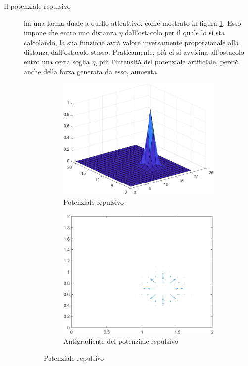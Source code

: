 \documentclass[14pt,a4paper]{extarticle}
\begin{document}
\begin{description}
\item[Il potenziale repulsivo] ha una forma duale a quello attrattivo, come mostrato in figura \ref{potR}. Esso impone che entro uno distanza \(\eta\) dall'ostacolo per il quale lo si sta calcolando, la sua funzione avrà valore inversamente proporzionale alla distanza dall'ostacolo stesso. Praticamente, più ci si avvicina all'ostacolo entro una certa soglia \(\eta\), più l'intensità del potenziale artificiale, perciò anche della forza generata da esso, aumenta.

\begin{figure}[H]
\begin{subfigure}[t]{0.5\textwidth}
\caption{Potenziale repulsivo}
\label{potR}
\includegraphics[width=\textwidth]{potR.png}
\end{subfigure}
\hfill
\begin{subfigure}[t]{0.5\textwidth}
\caption{Antigradiente del potenziale repulsivo}
\label{antigradR}
\includegraphics[width=\textwidth]{antigradR.png}
\end{subfigure}
\caption{Potenziale repulsivo}
\end{figure}


\end{description}
\end{document}
